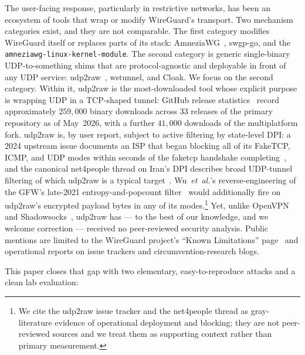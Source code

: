 \documentclass[conference]{IEEEtran}
\begin{document}
The user-facing response, particularly in restrictive networks, has been an
ecosystem of tools that wrap or modify WireGuard's transport. Two
mechanism categories exist, and they are not comparable.
The first category modifies WireGuard itself or replaces parts of its
stack: AmneziaWG~\cite{amneziawg}, swgp-go, and the
\texttt{amneziawg-linux-kernel-module}. The second category is generic
single-binary UDP-to-something shims that are protocol-agnostic and
deployable in front of any UDP service: udp2raw~\cite{udp2raw}, wstunnel,
and Cloak. We focus on the second category. Within it, udp2raw is the
most-downloaded tool whose explicit purpose is wrapping UDP in a
TCP-shaped tunnel: GitHub release statistics~\cite{ghapi_udp2raw}
record approximately $259{,}000$ binary downloads across 33 releases of
the primary repository as of May~2026, with a further $41{,}000$ downloads
of the multiplatform fork. udp2raw is, by user report, subject to active filtering by
state-level DPI: a 2024 upstream issue documents an ISP that began
blocking all of its FakeTCP, ICMP, and UDP modes within seconds of the
faketcp handshake completing~\cite{udp2raw_issue505}, and the
canonical net4people thread on Iran's DPI describes broad UDP-tunnel
filtering of which udp2raw is a typical target~\cite{net4people_iran253}.
Wu~\textit{et~al.}'s reverse-engineering of the GFW's
late-2021 entropy-and-popcount filter~\cite{wu2023gfw} would
additionally fire on udp2raw's encrypted payload bytes in any of its
modes.\footnote{We cite the udp2raw issue tracker and the net4people
thread as gray-literature evidence of operational deployment and
blocking; they are not peer-reviewed sources and we treat them as
supporting context rather than primary measurement.} Yet, unlike OpenVPN~\cite{xue2022openvpn} and
Shadowsocks~\cite{alice2020shadowsocks}, udp2raw has --- to the best
of our knowledge, and we welcome correction --- received no
peer-reviewed security analysis. Public mentions are limited to the
WireGuard project's ``Known Limitations'' page~\cite{wgknown} and
operational reports on issue trackers and circumvention-research
blogs.

This paper closes that gap with two elementary, easy-to-reproduce attacks
and a clean lab evaluation:
\end{document}
